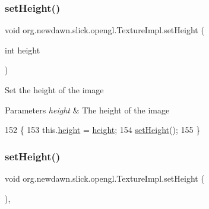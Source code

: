 \subsubsection{\texorpdfstring{set\+Height()}{setHeight()}\hspace{0.1cm}{\footnotesize\ttfamily [1/2]}}
{\footnotesize\ttfamily void org.\+newdawn.\+slick.\+opengl.\+Texture\+Impl.\+set\+Height (\begin{DoxyParamCaption}\item[{int}]{height }\end{DoxyParamCaption})\hspace{0.3cm}{\ttfamily [inline]}}

Set the height of the image


\begin{DoxyParams}{Parameters}
{\em height} & The height of the image \\
\hline
\end{DoxyParams}

\begin{DoxyCode}
152                                       \{
153         this.\mbox{\hyperlink{classorg_1_1newdawn_1_1slick_1_1opengl_1_1_texture_impl_a53e8d062d8f983a3a1a845d34bdbd834}{height}} = \mbox{\hyperlink{classorg_1_1newdawn_1_1slick_1_1opengl_1_1_texture_impl_a53e8d062d8f983a3a1a845d34bdbd834}{height}};
154         \mbox{\hyperlink{classorg_1_1newdawn_1_1slick_1_1opengl_1_1_texture_impl_a8a0e3f81daf28807c80daac7e3927808}{setHeight}}();
155     \}
\end{DoxyCode}
\mbox{\label{classorg_1_1newdawn_1_1slick_1_1opengl_1_1_texture_impl_a8a0e3f81daf28807c80daac7e3927808}} 
\subsubsection{\texorpdfstring{set\+Height()}{setHeight()}\hspace{0.1cm}{\footnotesize\ttfamily [2/2]}}
{\footnotesize\ttfamily void org.\+newdawn.\+slick.\+opengl.\+Texture\+Impl.\+set\+Height (\begin{DoxyParamCaption}{ }\end{DoxyParamCaption})\hspace{0.3cm}{\ttfamily [inline]}, {\ttfamily [private]}}

